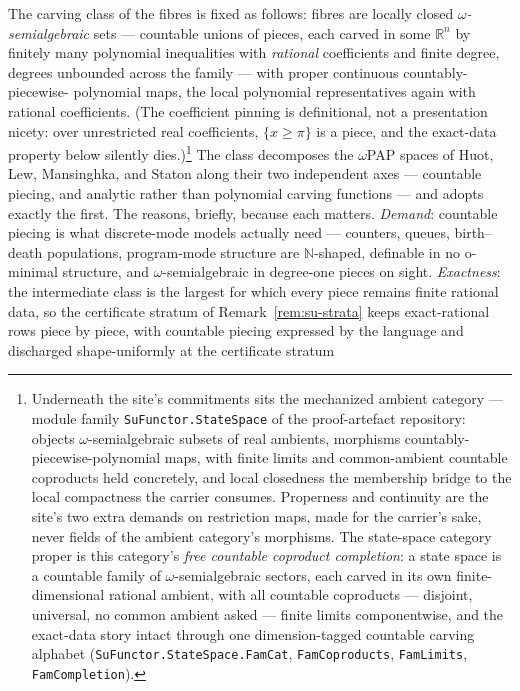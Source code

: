 The carving class of the fibres is fixed as follows: fibres are
locally closed \emph{$\omega$-semialgebraic} sets --- countable
unions of pieces, each carved in some $\mathbb{R}^n$ by finitely many
polynomial inequalities with \emph{rational} coefficients and finite
degree, degrees unbounded
across the family --- with proper continuous countably-piecewise-%
polynomial maps, the local polynomial representatives again with
rational coefficients. (The coefficient pinning is definitional,
not a presentation nicety: over unrestricted real coefficients,
$\{x \ge \pi\}$ is a piece, and the exact-data property below
silently dies.)\footnote{Underneath the site's commitments sits the
mechanized ambient category --- module family
\texttt{SuFunctor.StateSpace} of the proof-artefact repository:
objects $\omega$-semialgebraic subsets
of real ambients, morphisms countably-piecewise-polynomial maps, with
finite limits and common-ambient countable coproducts held
concretely, and local closedness the membership bridge to the local
compactness the carrier consumes. Properness and continuity are
the site's two extra demands on restriction maps, made for the
carrier's sake, never fields of the ambient category's morphisms.
The state-space category proper is this category's \emph{free
countable coproduct completion}: a state space is a countable family
of $\omega$-semialgebraic sectors, each carved in its own
finite-dimensional rational ambient, with all countable coproducts
--- disjoint, universal, no common ambient asked --- finite limits
componentwise, and the exact-data story intact through one
dimension-tagged countable carving alphabet
(\texttt{SuFunctor.StateSpace.FamCat},
\texttt{FamCoproducts}, \texttt{FamLimits},
\texttt{FamCompletion}).} The class decomposes the $\omega$PAP spaces of
Huot, Lew, Mansinghka, and Staton \cite{huot23omega} along their two
independent axes --- countable piecing, and analytic rather than
polynomial carving functions --- and adopts exactly the first.
The reasons, briefly, because each matters.
\emph{Demand}: countable piecing is what discrete-mode models
actually need --- counters, queues, birth--death populations,
program-mode structure are $\mathbb{N}$-shaped, definable in no
o-minimal structure, and $\omega$-semialgebraic in degree-one pieces
on sight. \emph{Exactness}: the intermediate class is the largest for
which every piece remains finite rational data, so the certificate
stratum of Remark~\ref{rem:su-strata} keeps exact-rational rows
piece by piece, with countable piecing expressed by the language
and discharged shape-uniformly at the certificate stratum
